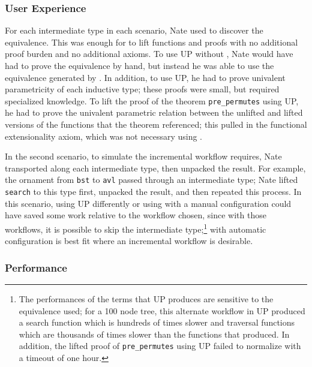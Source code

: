 \subsubsection{User Experience}
\label{sec:caseuser}

For each intermediate type in each scenario, Nate used \toolnamec to discover the equivalence.
This was enough for \toolnamec to lift functions and proofs 
with no additional proof burden and no additional axioms.
To use UP without \toolnamec, Nate would have had to prove the equivalence by hand,
but instead he was able to use the equivalence generated by \toolnamec.
In addition, to use UP, he had to prove univalent parametricity of each inductive type;
these proofs were small, but required specialized knowledge.
To lift the proof of the theorem \lstinline{pre_permutes} using UP, 
he had to prove the univalent parametric relation between the unlifted and lifted versions of the
functions that the theorem referenced; this pulled in the functional extensionality axiom, which was not necessary 
using \toolnamec.

In the second scenario, to simulate the incremental workflow \toolnameb requires, Nate transported along each intermediate type, then unpacked the result.
For example, the ornament from \lstinline{bst} to \lstinline{avl} passed through an intermediate type;
Nate lifted \lstinline{search} to this type first, unpacked the result, and then repeated this process.
In this scenario, using UP differently or using \toolnamec with a manual configuration could have saved some work relative to the workflow chosen,
since with those workflows, it is possible to skip 
the intermediate type;\footnote{The performances of the terms that UP produces are sensitive to the equivalence used;
for a 100 node tree, this alternate workflow in UP produced a search function
which is hundreds of times slower and traversal functions which are thousands of times slower
than the functions that \toolnamec produced. In addition, the lifted proof of \lstinline{pre_permutes} using UP failed to normalize
with a timeout of one hour.}
\toolnamec with automatic configuration is best fit where an incremental workflow is desirable.

\subsubsection{Performance}
\label{sec:caseperf}


